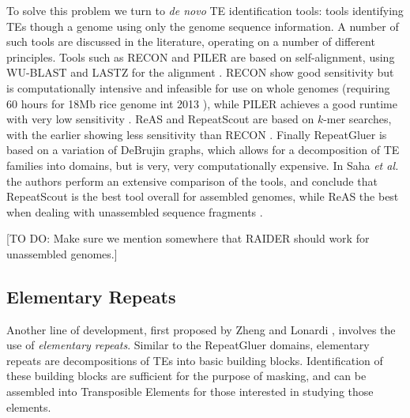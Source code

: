 \documentclass{bmcart}
\begin{document}
To solve this problem we turn to {\it de novo} TE identification
tools: tools identifying TEs though a genome using only the genome
sequence information.  A number of such tools are discussed in the
literature, operating on a number of different principles.  Tools such
as RECON and PILER are based on
self-alignment, using WU-BLAST and LASTZ for the alignment
\cite{Bao:2002,Edgar:2005p2365,Lopez:2003td,Harris:2007uf}.  RECON show good sensitivity but is
computationally intensive and infeasible for use on whole genomes
(requiring 60 hours for 18Mb rice genome int 2013 \cite{Jiang:2013jt}), while
PILER achieves a good runtime with very low sensitivity
\cite{Jiang:2013jt}.  ReAS \cite{Li:2005p3138} and RepeatScout
\cite{Price:2005p1247} are based on $k$-mer searches, with the
earlier showing less sensitivity than RECON \cite{Jiang:2013jt}.
Finally RepeatGluer \cite{Pevzner:2004p3157,Zhi:2006p3199} is
based on a variation of DeBrujin graphs, which allows for a
decomposition of TE families into domains, but is very, very
computationally expensive.  In Saha {\it et al.} the authors perform
an extensive comparison of the tools, and conclude that RepeatScout is
the best tool overall for assembled genomes, while ReAS the best when
dealing with unassembled sequence fragments \cite{Saha:2008dm}.

[TO DO: Make sure we mention somewhere that RAIDER should work for
  unassembled genomes.]

\subsection*{Elementary Repeats}
Another line of development, first proposed by Zheng and Lonardi
\cite{Zheng:2005bl}, involves the use of {\it elementary repeats}.
Similar to the RepeatGluer domains, elementary repeats are
decompositions of TEs into basic building blocks.  Identification of
these building blocks are sufficient for the purpose
of masking, and can be assembled into Transposible Elements for those
interested in studying those elements.
\end{document}
